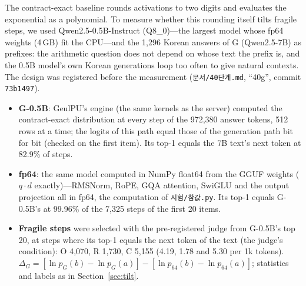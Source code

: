 \documentclass[11pt]{article}
\begin{document}
The contract-exact baseline rounds activations to two digits and evaluates the exponential as a polynomial. To measure whether
this rounding itself tilts fragile steps, we used Qwen2.5-0.5B-Instruct (Q8\_0)---the largest model whose fp64 weights (4\,GB)
fit the CPU---and the 1,296 Korean answers of G (Qwen2.5-7B) as prefixes: the arithmetic question does not depend on whose
text the prefix is, and the 0.5B model's own Korean generations loop too often to give natural contexts. The design was
registered before the measurement (\texttt{문서/40단계.md}, ``40g'', commit \texttt{73b1497}).
\begin{itemize}
\item \textbf{G-0.5B}: GeulPU's engine (the same kernels as the server) computed the contract-exact distribution at every step
      of the 972,380 answer tokens, 512 rows at a time; the logits of this path equal those of the generation path bit for
      bit (checked on the first item). Its top-1 equals the 7B text's next token at 82.9\% of steps.
\item \textbf{fp64}: the same model computed in NumPy float64 from the GGUF weights ($q\cdot d$ exactly)---RMSNorm, RoPE, GQA
      attention, SwiGLU and the output projection all in fp64, the computation of \texttt{시험/참값.py}. Its top-1 equals
      G-0.5B's at 99.96\% of the 7,325 steps of the first 20 items.
\item \textbf{Fragile steps} were selected with the pre-registered judge from G-0.5B's top 20, at steps where its top-1 equals
      the next token of the text (the judge's condition): O 4,070, R 1,730, C 5,155 (4.19, 1.78 and 5.30 per 1k tokens).
      $\Delta_G = [\ln p_G(b) - \ln p_G(a)] - [\ln p_{64}(b) - \ln p_{64}(a)]$; statistics and labels as in
      Section~\ref{sec:tilt}.
\end{itemize}
\end{document}
